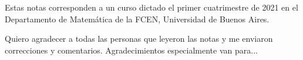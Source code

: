 \preface

Estas notas corresponden a un curso dictado el primer cuatrimestre de 2021 en 
el Departamento de Matemática de la FCEN, Universidad de Buenos Aires. 

Quiero agradecer a todas las personas que leyeron las notas y me enviaron 
correcciones y comentarios. Agradecimientos especialmente van para...